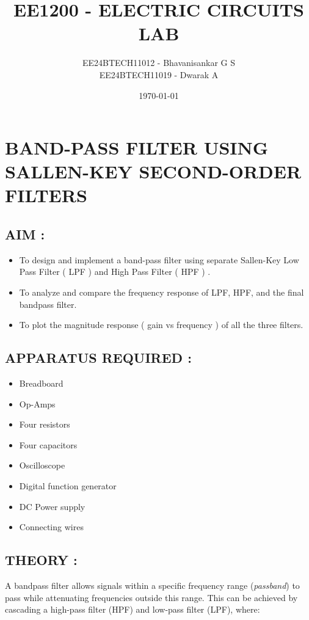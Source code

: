 \documentclass[12pt]{article}
\title{\textbf{EE1200 - ELECTRIC CIRCUITS LAB}}
\author{EE24BTECH11012 - Bhavanisankar G S \\ EE24BTECH11019 - Dwarak A}
\date{\today}
\begin{document}
\maketitle
\thispagestyle{empty}

\newpage

\section{BAND-PASS FILTER USING SALLEN-KEY SECOND-ORDER FILTERS}

\subsection{\textbf{AIM} : } 
\begin{itemize}
	\item To design and implement a band-pass filter using separate Sallen-Key Low Pass Filter ( LPF ) and High Pass Filter ( HPF ) .
	\item To analyze and compare the frequency response of LPF, HPF, and the final bandpass filter.
	\item To plot the magnitude response ( gain vs frequency ) of all the three filters.
\end{itemize}

\subsection{\textbf{APPARATUS REQUIRED} : }
\begin{itemize}
	\item Breadboard
	\item Op-Amps
	\item Four resistors
	\item Four capacitors
	\item Oscilloscope
	\item Digital function generator
	\item DC Power supply
	\item Connecting wires
\end{itemize}

\subsection{\textbf{THEORY} : }
A bandpass filter allows signals within a specific frequency range (\textit{passband}) to pass while attenuating frequencies outside this range. This can be achieved by cascading a high-pass filter (HPF) and low-pass filter (LPF), where:
\end{document}
